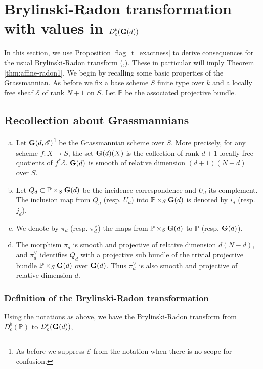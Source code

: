 \documentclass[12pt, reqno]{amsart}
\theoremstyle{plain}
\theoremstyle{definition}
\theoremstyle{definition}
\newcommand{\bbP}{{\mathbb P}}
\newcommand{\bG}{{\bf G}}
\newcommand{\sE}{{\mathscr E}}
\begin{document}
\section{Brylinski-Radon transformation with values in $D^b_c(\bG(d))$}\label{Brylinski-Radon}

In this section, we use Proposition \ref{flag_t_exactness} to derive consequences for the usual Brylinski-Radon transform (\cite[I, \S V]{Br},\cite[\S 2.2.2]{DS23}). These in particular will imply Theorem \ref{thm:affine-radon1}. We begin by recalling some basic properties of the Grassmannian. As before we fix a base scheme $S$ finite type over $k$ and a locally free sheaf $\sE$ of rank $N+1$ on $S$. Let $\bbP$ be the associated projective bundle. 

\subsection{Recollection about Grassmannians}\label{Grassmannians}
\begin{enumerate}[(a)]
    \item Let $\bG(d,\sE)$\footnote{As before we suppress $\sE$ from the notation when there is no scope for confusion.} be the Grassmannian scheme over $S$. More precisely, for any scheme $f \colon X \to S$, the set $\bG(d)(X)$ is the collection of rank $d+1$ locally free quotients of $f^*\sE$. $\bG(d)$ is smooth of relative dimension $(d+1)(N-d)$ over $S$. 

    \item Let $Q_{d} \subset \bbP \times_S \bG(d)$ be the incidence correspondence and $U_{d}$ its complement. The inclusion map from $Q_d$ (resp. $U_d$) into $\bbP \times_S \bG(d)$ is denoted by $i_d$ (resp. $j_d$).

    \item We denote by $\pi_{d}$ (resp. $\pi^{\vee}_{d}$) the maps from $\bbP \times_S \bG(d)$ to $\bbP$ (resp. $\bG(d)$). 
    
    \item The morphism $\pi_{d}$ is smooth and projective of relative dimension $d(N-d)$, and $\pi^{\vee}_{d}$ identifies $Q_{d}$ with a projective sub bundle of the trivial projective bundle $\bbP \times_S \bG(d)$ over $\bG(d)$. Thus $\pi^{\vee}_{d}$ is also smooth and projective of relative dimension $d$.

\end{enumerate}

\subsubsection{Definition of the Brylinski-Radon transformation}\label{def_BR}
Using the notations as above, we have the Brylinski-Radon transform \cite[I, \S V]{Br} from $D^b_c(\bbP)$ to $D^b_c(\bG(d))$,
\end{document}
